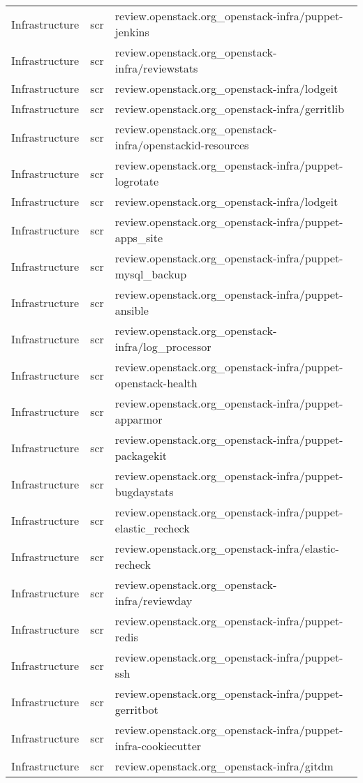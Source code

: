 \begin{center}
\begin{longtable}{|p{4cm}|p{1cm}|p{10cm}|}
Infrastructure&scr&review.openstack.org\_openstack-infra/puppet-jenkins\\ 
Infrastructure&scr&review.openstack.org\_openstack-infra/reviewstats\\ 
Infrastructure&scr&review.openstack.org\_openstack-infra/lodgeit\\ 
Infrastructure&scr&review.openstack.org\_openstack-infra/gerritlib\\ 
Infrastructure&scr&review.openstack.org\_openstack-infra/openstackid-resources\\ 
Infrastructure&scr&review.openstack.org\_openstack-infra/puppet-logrotate\\ 
Infrastructure&scr&review.openstack.org\_openstack-infra/lodgeit\\ 
Infrastructure&scr&review.openstack.org\_openstack-infra/puppet-apps\_site\\ 
Infrastructure&scr&review.openstack.org\_openstack-infra/puppet-mysql\_backup\\ 
Infrastructure&scr&review.openstack.org\_openstack-infra/puppet-ansible\\ 
Infrastructure&scr&review.openstack.org\_openstack-infra/log\_processor\\ 
Infrastructure&scr&review.openstack.org\_openstack-infra/puppet-openstack-health\\ 
Infrastructure&scr&review.openstack.org\_openstack-infra/puppet-apparmor\\ 
Infrastructure&scr&review.openstack.org\_openstack-infra/puppet-packagekit\\ 
Infrastructure&scr&review.openstack.org\_openstack-infra/puppet-bugdaystats\\ 
Infrastructure&scr&review.openstack.org\_openstack-infra/puppet-elastic\_recheck\\ 
Infrastructure&scr&review.openstack.org\_openstack-infra/elastic-recheck\\ 
Infrastructure&scr&review.openstack.org\_openstack-infra/reviewday\\ 
Infrastructure&scr&review.openstack.org\_openstack-infra/puppet-redis\\ 
Infrastructure&scr&review.openstack.org\_openstack-infra/puppet-ssh\\ 
Infrastructure&scr&review.openstack.org\_openstack-infra/puppet-gerritbot\\ 
Infrastructure&scr&review.openstack.org\_openstack-infra/puppet-infra-cookiecutter\\ 
Infrastructure&scr&review.openstack.org\_openstack-infra/gitdm\\ 

\end{longtable}
\end{center}
